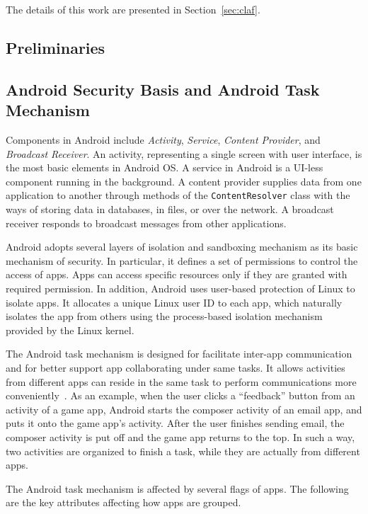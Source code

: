\documentclass[letterpaper,12pt]{article}
\begin{document}
The details of this work are presented in Section~\ref{sec:claf}. 

   \newpage
      \begin{singlespace}
           \section{Preliminaries}
      \end{singlespace}
   \label{sec:preliminaries}
\subsection{Android Security Basis and Android Task Mechanism}
Components in Android include {\em Activity}, {\em Service}, {\em
  Content Provider}, and {\em Broadcast Receiver}. An activity,
representing a single screen with user interface, is the most basic
elements in Android OS. A service in Android is a UI-less component
running in the background. A content provider supplies data from one
application to another through methods of the \texttt{ContentResolver}
class with the ways of storing data in databases, in files, or over
the network. A broadcast receiver responds to broadcast messages from
other applications.

Android adopts several layers of isolation and sandboxing mechanism as
its basic mechanism of security. In particular, it defines a set of
permissions to control the access of apps. Apps can access specific
resources only if they are granted with required permission.  In
addition, Android uses user-based protection of Linux to isolate
apps. It allocates a unique Linux user ID to each app, which naturally
isolates the app from others using the process-based isolation
mechanism provided by the Linux kernel.

The Android task mechanism is designed for facilitate inter-app
communication and for better support app collaborating under same
tasks. It allows activities from different apps can reside in the same
task to perform communications more conveniently~\cite{taskdoc}.  As
an example, when the user clicks a ``feedback'' button from an
activity of a game app, Android starts the composer activity of an
email app, and puts it onto the game app's activity.  After the user
finishes sending email, the composer activity is put off and the game
app returns to the top.  In such a way, two activities are organized
to finish a task, while they are actually from different apps.


The Android task mechanism is affected by several flags of apps. The
following are the key attributes affecting how apps are grouped.
\end{document}
